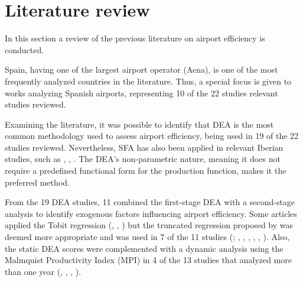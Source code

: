 
\section{Literature review}
\label{sec:backg}
In this section a review of the previous literature on airport efficiency is conducted.

Spain, having one of the largest airport operator (Aena), is one of the most frequently analyzed countries in the literature. Thus, a special focus is given to works analyzing Spanish airports, representing 10 of the 22 studies relevant studies reviewed.

Examining the literature, it was possible to identify that DEA is the most common methodology used to assess airport efficiency, being used in 19 of the 22 studies reviewed. Nevertheless, SFA has also been applied in relevant Iberian studies, such as \cite{barros2008}, \cite{tovar2010}, \cite{martin2011}. The DEA's non-parametric nature, meaning it does not require a predefined functional form for the production function, makes it the preferred method. 

From the 19 DEA studies, 11 combined the first-stage DEA with a second-stage analysis to identify exogenous factors influencing airport efficiency. Some articles applied the Tobit regression (\cite{coto-millan2014}, \cite{fragoudaki2016}, \cite{coto-millan2016}) but the truncated regression proposed by \cite{simar2007} was deemed more appropriate and was used in 7 of the 11 studies (\cite{barrosdieke2008}; \cite{barros2008b}, \cite{tsekeris2011}, \cite{chang2013}, \cite{adler2013}, \cite{fernandez2022}, \cite{cifuentes-faura2023}).
Also, the static DEA scores were complemented with a dynamic analysis using the Malmquist Productivity Index (MPI) in 4 of the 13 studies that analyzed more than one year (\cite{fung2008}, \cite{tovar2010}, \cite{coto-millan2014}, \cite{inglada2018}).

